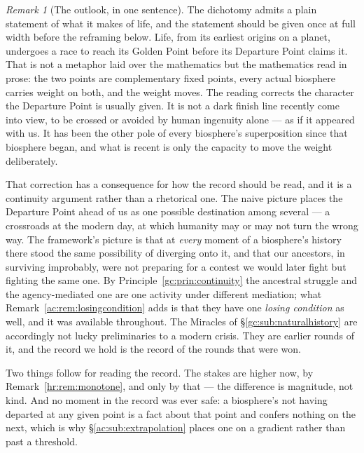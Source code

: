 \documentclass[11pt]{article}
\numberwithin{equation}{section}
\theoremstyle{plain}
\theoremstyle{definition}
\theoremstyle{remark}
\newtheorem{remark}[theorem]{Remark}
\begin{document}
\begin{remark}[The outlook, in one sentence]\label{ac:rem:race}
The dichotomy admits a plain statement of what it makes of life, and the
statement should be given once at full width before the reframing below.
Life, from its earliest origins on a planet, undergoes a race to reach
its Golden Point before its Departure Point claims it. That is not a
metaphor laid over the mathematics but the mathematics read in prose:
the two points are complementary fixed points, every actual biosphere
carries weight on both, and the weight moves. The reading corrects the
character the Departure Point is usually given. It is not a dark finish
line recently come into view, to be crossed or avoided by human ingenuity
alone --- as if it appeared with us. It has been the other pole of every
biosphere's superposition since that biosphere began, and what is recent
is only the capacity to move the weight deliberately.
\end{remark}

That correction has a consequence for how the record should be read, and
it is a continuity argument rather than a rhetorical one. The naive
picture places the Departure Point ahead of us as one possible
destination among several --- a crossroads at the modern day, at which
humanity may or may not turn the wrong way. The framework's picture is
that at \emph{every} moment of a biosphere's history there stood the
same possibility of diverging onto it, and that our ancestors, in
surviving improbably, were not preparing for a contest we would later
fight but fighting the same one. By
Principle~\ref{gc:prin:continuity} the ancestral struggle and the
agency-mediated one are one activity under different mediation; what
Remark~\ref{ac:rem:losingcondition} adds is that they have one
\emph{losing condition} as well, and it was available throughout. The
Miracles of \S\ref{gc:sub:naturalhistory} are accordingly not
lucky preliminaries to a modern crisis. They are earlier rounds of it,
and the record we hold is the record of the rounds that were won.

Two things follow for reading the record. The stakes are higher now, by
Remark~\ref{hr:rem:monotone}, and only by that --- the difference is
magnitude, not kind. And no moment in the record was ever safe: a
biosphere's not having departed at any given point is a fact about that
point and confers nothing on the next, which is why
\S\ref{ac:sub:extrapolation} places one on a gradient rather than past a
threshold.
\end{document}
